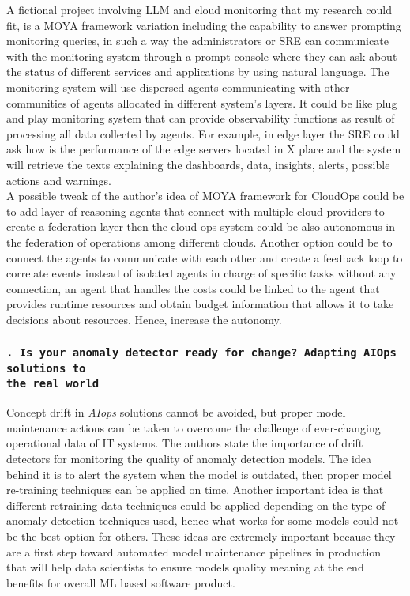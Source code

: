 \documentclass[11pt,a4paper]{article}
\begin{document}
A fictional project involving LLM and cloud monitoring that my research could fit, is a MOYA framework variation including the capability to answer prompting monitoring queries, in such a way the administrators or SRE can communicate with the monitoring system through a prompt console where they can ask about the status of different services and applications by using natural language. The monitoring system will use dispersed agents communicating with other communities of agents allocated in different system's layers. It could be like plug and play monitoring system that can provide observability functions as result of processing all data collected by agents. For example, in edge layer the SRE could ask how is the performance of the edge servers located in X place and the system will retrieve the texts explaining the dashboards, data, insights, alerts, possible actions and warnings.
\\

A possible tweak of the author’s idea of MOYA framework for CloudOps could be to add layer of reasoning agents that connect with multiple cloud providers to create a federation layer then the cloud ops system could be also autonomous in the federation of operations among different clouds. Another option could be to connect the agents to communicate with each other and create a feedback loop to correlate events instead of isolated agents in charge of specific tasks without any connection, an agent that handles the costs could be linked to the agent that provides runtime resources and obtain budget information that allows it to take decisions about resources. Hence, increase the autonomy. 

\setcounter{papernum}{2} 
\subsubsection*{\texttt{. Is your anomaly detector ready for change? Adapting AIOps solutions to \\the real world \cite{Poenaru-Olaru} }}

Concept drift in \textit{AIops} solutions cannot be avoided, but proper model maintenance actions can be taken to overcome the challenge of ever-changing operational data of IT systems. The authors state the importance of drift detectors for monitoring the quality of anomaly detection models. The idea behind it is to alert the system when the model is outdated, then proper model re-training techniques can be applied on time. Another important idea is that different retraining data techniques could be applied depending on the type of anomaly detection techniques used, hence what works for some models could not be the best option for others. These ideas are extremely important because they are a first step toward automated model maintenance pipelines in production that will help data scientists to ensure models quality meaning at the end benefits for overall ML based software product. 
\\
\end{document}
